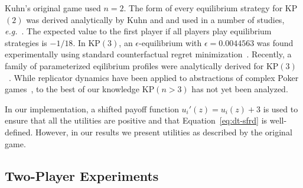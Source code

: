 \documentclass{aamas2014}
\newcommand{\eg}{{\it e.g.}}
\begin{document}
Kuhn's original game used $n = 2$. The form of every equilibrium strategy for KP$(2)$ was derived analytically
by Kuhn and and used in a number of studies, \eg~\cite{hoehn05}. 
The expected value to the first player if all players play equilibrium strategies is $-1/18$. 
In KP$(3)$, an $\epsilon$-equilibrium with $\epsilon = 0.0044563$ was 
found experimentally using standard counterfactual regret minimization~\cite{AbouRisk10}. 
Recently, a family of parameterized eqilibrium profiles were analytically derived for KP$(3)$~\cite{Szafron13Kuhn}.
While replicator dynamics have been applied to abstractions of complex Poker games~\cite{ponsen09b},
to the best of our knowledge KP$(n > 3)$ has not yet been analyzed.


In our implementation, a shifted payoff function $u_i'(z) = u_i(z) + 3$ is used to ensure that all the utilities are positive
and that Equation~\ref{eq:dt-sfrd} is well-defined. However, in our results we present utilities as described by the original
game. %


\subsection{Two-Player Experiments}
\end{document}
